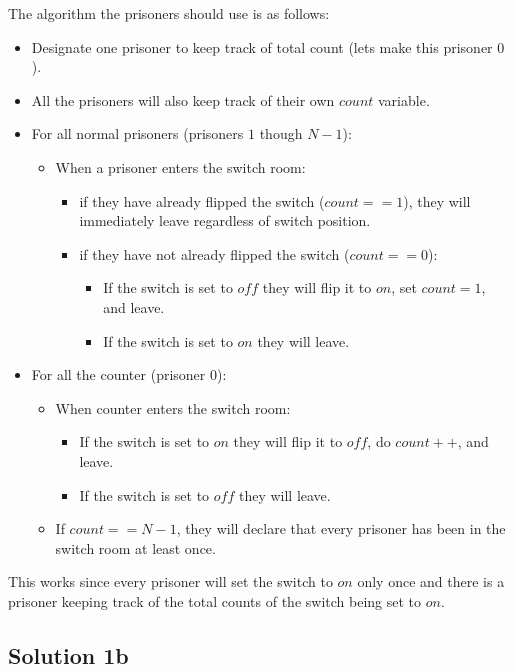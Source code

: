 \documentclass{article}
\begin{document}
The algorithm the prisoners should use is as follows:
\begin{itemize}[label={}]
\item Designate one prisoner to keep track of total count (lets make this prisoner $0$).
\item All the prisoners will also keep track of their own $count$ variable.

\item For all normal prisoners (prisoners $1$ though $N-1$):
	\begin{itemize}[label={}]
	\item When a prisoner enters the switch room:
		\begin{itemize}[label={}]
		\item if they have already flipped the switch ($count == 1$), they will immediately leave regardless of switch position.
		\item if they have not already flipped the switch ($count == 0$):
			\begin{itemize} [label={}]
			\item If the switch is set to $off$ they will flip it to $on$, set $count = 1$, and leave.
			\item If the switch is set to $on$ they will leave.
			\end{itemize}
		\end{itemize}
	\end{itemize}
\item For all the counter (prisoner $0$):
	\begin{itemize}[label={}]
	\item When counter enters the switch room:
		\begin{itemize}[label={}]
		\item If the switch is set to $on$ they will flip it to $off$, do $count++$, and leave.
		\item If the switch is set to $off$ they will leave.
		\end{itemize}
	\item If $count == N-1$, they will declare that every prisoner has been in the switch room at least once.
	\end{itemize}
\end{itemize}
This works since every prisoner will set the switch to $on$ only once and there is a prisoner keeping track of the total counts of the switch being set to $on$. 

\subsection{Solution 1b}
\end{document}
